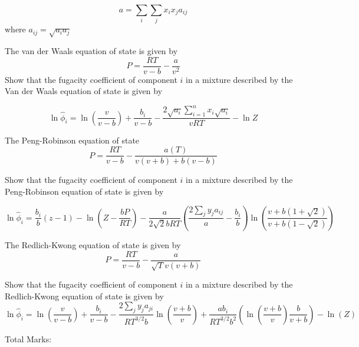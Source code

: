 \documentclass[12pt, A4paper]{article}
\begin{document}
$$
a = \sum_{i}\sum_{j} x_i x_j a_{ij}
$$
 where $a_{ij} = \sqrt{a_i a_j}$
 

The van der Waals equation of state is given by
$$
P = \frac{RT}{v - b} - \frac{a}{v^2}
$$
 Show that the fugacity coefficient of component $i$ in a mixture described by the Van der Waals equation of state is given by
 
$$
\ln{\hat{\phi}_i} = \ln{\left(\frac{v}{v - b} \right)}+ \frac{b_i}{v - b} - \frac{2 \sqrt{a_i} \sum_{i = 1}^n x_i \sqrt{a_i} }{v R T} - \ln{Z}
$$


The Peng-Robinson equation of state 
$$
P = \frac{RT}{v - b} - \frac{a (T)}{ v(v + b) + b (v - b)}
$$

 Show that the fugacity coefficient of component $i$ in a mixture described by the Peng-Robinson equation of state is given by
 
$$
\ln{\hat{\phi}_i} = \frac{b_i}{b} (z - 1) - \ln{\left( Z - \frac{b P}{RT} \right) - \frac{a}{2 \sqrt{2} b R T} \left(\frac{2 \sum_{j} y_j a_{ij}}{a} - \frac{b_i}{b} \right) \ln{\left( \frac{ v + b \left( 1 + \sqrt{2}\right) }{v + b \left( 1 - \sqrt{2}\right) }\right)}}
$$ 
 
 The Redlich-Kwong equation of state is given by
 $$
 P = \frac{RT}{v - b} - \frac{a}{\sqrt{T} v \left(v + b \right)}
 $$


  Show that the fugacity coefficient of component $i$ in a mixture described by the Redlich-Kwong equation of state is given by
 $$
\ln{\hat{\phi}_i} = \ln{\left(\frac{v}{v - b} \right)}  + \frac{b_i}{v - b} - \frac{2 \sum_{j} y_j a_{ji}}{R T^{3/2} b} \ln{\left( \frac{v + b}{v} \right)}  + \frac{a b_i}{RT^{3/2} b^2} \left( \ln \left( \frac{v + b}{v}\right) \frac{b}{v + b}  \right) - \ln(Z)
$$
 
\begin{centering}
Total Marks: \\
\end{centering}
\end{document}
